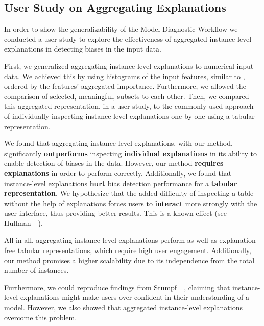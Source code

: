 \subsection{User Study on Aggregating Explanations}
In order to show the generalizability of the Model Diagnostic Workflow we conducted a user study to explore the effectiveness of aggregated instance-level explanations in detecting biases in the input data.

First, we generalized aggregating instance-level explanations to numerical input data.
We achieved this by using histograms of the input features, similar to \cite{seekaview}, ordered by the features' aggregated importance.
Furthermore, we allowed the comparison of selected, meaningful, subsets to each other.
Then, we compared this aggregated representation, in a user study, to the commonly used approach of individually inspecting instance-level explanations one-by-one using a tabular representation.

We found that aggregating instance-level explanations, with our method, significantly \textbf{outperforms} inspecting \textbf{individual explanations} in its ability to enable detection of biases in the data.
However, our method \textbf{requires explanations} in order to perform correctly.
Additionally, we found that instance-level explanations \textbf{hurt} bias detection performance for a \textbf{tabular representation}.
We hypothesize that the added difficulty of inspecting a table without the help of explanations forces users to \textbf{interact} more strongly with the user interface, thus providing better results.
This is a known effect (see Hullman~\etal~\cite{6064986}).

All in all, aggregating instance-level explanations perform as well as explanation-free tabular representations, which require high user engagement.
Additionally, our method promises a higher scalability due to its independence from the total number of instances.

Furthermore, we could reproduce findings from Stumpf~\etal~\cite{harmful}, claiming that instance-level explanations might make users over-confident in their understanding of a model.
However, we also showed that aggregated instance-level explanations overcome this problem.

